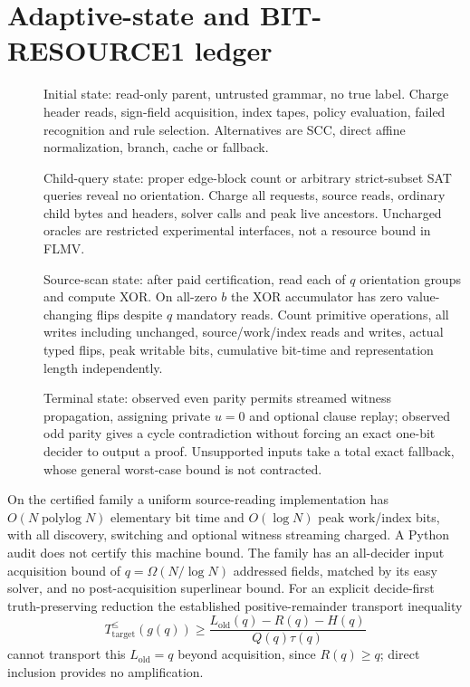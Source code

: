 \documentclass[11pt]{article}
\begin{document}
\section{Adaptive-state and BIT-RESOURCE1 ledger}
\begin{description}
\item[] Initial state: read-only parent, untrusted grammar, no true label. Charge header reads, sign-field acquisition, index tapes, policy evaluation, failed recognition and rule selection. Alternatives are SCC, direct affine normalization, branch, cache or fallback.
\item[] Child-query state: proper edge-block count or arbitrary strict-subset SAT queries reveal no orientation. Charge all requests, source reads, ordinary child bytes and headers, solver calls and peak live ancestors. Uncharged oracles are restricted experimental interfaces, not a resource bound in FLMV.
\item[] Source-scan state: after paid certification, read each of $q$ orientation groups and compute XOR. On all-zero $b$ the XOR accumulator has zero value-changing flips despite $q$ mandatory reads. Count primitive operations, all writes including unchanged, source/work/index reads and writes, actual typed flips, peak writable bits, cumulative bit-time and representation length independently.
\item[] Terminal state: observed even parity permits streamed witness propagation, assigning private $u=0$ and optional clause replay; observed odd parity gives a cycle contradiction without forcing an exact one-bit decider to output a proof. Unsupported inputs take a total exact fallback, whose general worst-case bound is not contracted.
\end{description}
On the certified family a uniform source-reading implementation has $O(N\operatorname{polylog}N)$ elementary bit time and $O(\log N)$ peak work/index bits, with all discovery, switching and optional witness streaming charged. A Python audit does not certify this machine bound. The family has an all-decider input acquisition bound of $q=\Omega(N/\log N)$ addressed fields, matched by its easy solver, and no post-acquisition superlinear bound. For an explicit decide-first truth-preserving reduction the established positive-remainder transport inequality
\[
T_{\mathrm{target}}^{\le}(g(q))\ge\frac{L_{\mathrm{old}}(q)-R(q)-H(q)}{Q(q)\tau(q)}
\]
cannot transport this $L_{\mathrm{old}}=q$ beyond acquisition, since $R(q)\ge q$; direct inclusion provides no amplification.
\end{document}
